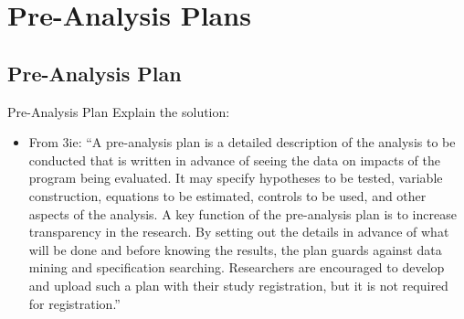 \documentclass{beamer}
\begin{document}
\section{Pre-Analysis Plans}


\subsection*{Pre-Analysis Plan}
\begin{frame}{Pre-Analysis Plan}
Explain the solution:
\begin{itemize}
\item
From 3ie: ``A pre-analysis plan is a detailed description of the analysis to be conducted that is written in advance of seeing the data on impacts of the program being evaluated. It may specify hypotheses to be tested, variable construction, equations to be estimated, controls to be used, and other aspects of the analysis. A key function of the pre-analysis plan is to increase transparency in the research. By setting out the details in advance of what will be done and before knowing the results, the plan guards against data mining and specification searching. Researchers are encouraged to develop and upload such a plan with their study registration, but it is not required for registration.''
\end{itemize}
\end{frame}
\end{document}
